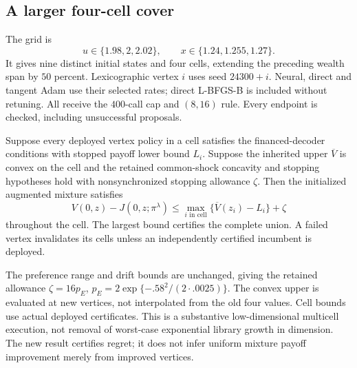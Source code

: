 \subsection{A larger four-cell cover}
The grid is
\[
 u\in\{1.98,2,2.02\},\qquad x\in\{1.24,1.255,1.27\}.
\]
It gives nine distinct initial states and four cells, extending the preceding wealth span by $50$ percent. Lexicographic vertex $i$ uses seed $24300+i$. Neural, direct and tangent Adam use their selected rates; direct L-BFGS-B is included without retuning. All receive the $400$-call cap and $(8,16)$ rule. Every endpoint is checked, including unsuccessful proposals.

\begin{proposition}\label{prop:r24cover}
Suppose every deployed vertex policy in a cell satisfies the financed-decoder conditions with stopped payoff lower bound $L_i$. Suppose the inherited upper $\overline V$ is convex on the cell and the retained common-shock concavity and stopping hypotheses hold with nonsynchronized stopping allowance $\zeta$. Then the initialized augmented mixture satisfies
\begin{equation}
 V(0,z)-J(0,z;\pi^\lambda)\leq\max_{i\text{ in cell}}\{\overline V(z_i)-L_i\}+\zeta
 \label{eq:r24cover}
\end{equation}
throughout the cell. The largest bound certifies the complete union. A failed vertex invalidates its cells unless an independently certified incumbent is deployed.
\end{proposition}
The preference range and drift bounds are unchanged, giving the retained allowance $\zeta=16p_E$, $p_E=2\exp\{-.58^2/(2\cdot.0025)\}$. The convex upper is evaluated at new vertices, not interpolated from the old four values. Cell bounds use actual deployed certificates. This is a substantive low-dimensional multicell execution, not removal of worst-case exponential library growth in dimension. The new result certifies regret; it does not infer uniform mixture payoff improvement merely from improved vertices.

